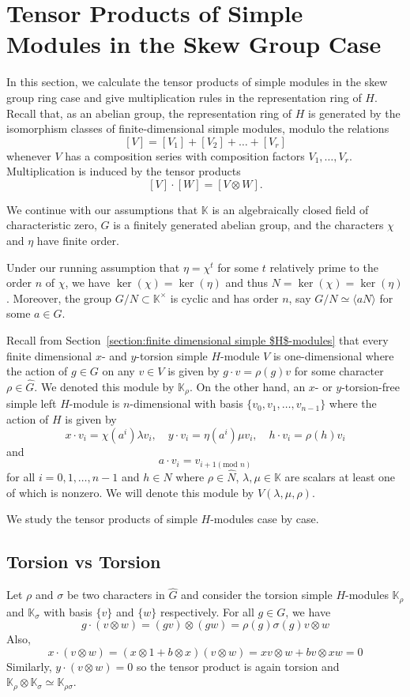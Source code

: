 \documentclass[11pt, twoside]{amsart}
\theoremstyle{definition}
\newcommand{\KK}{\mathbb{K}}
\begin{document}
\section{Tensor Products of Simple Modules in the Skew Group Case}
%
In this section, we calculate the tensor products of simple modules in the skew group ring case and give multiplication rules in the representation ring of $H$. Recall that, as an abelian group, the representation ring of $H$ is generated by the isomorphism classes of finite-dimensional simple modules, modulo the relations
%
\[[V] = [V_1] + [V_2] + \ldots + [V_r]\]
%
whenever $V$ has a composition series with composition factors $V_1, \ldots, V_r$. Multiplication is induced by the tensor products 
%
\[[V]\cdot [W] = [V \otimes W].\]
%

We continue with our assumptions that $\KK$ is an algebraically closed field of characteristic zero, $G$ is a finitely generated abelian group, and the characters $\chi$ and $\eta$ have finite order.

Under our running assumption that $\eta = \chi^t$ for some $t$ relatively prime to the order $n$ of $\chi$, we have $\ker(\chi) = \ker(\eta)$ and thus $N = \ker(\chi) = \ker(\eta)$. Moreover, the group $G/N \subset \KK^\times$ is cyclic and has order $n$, say $G/N \simeq \langle aN\rangle$ for some $a \in G$. 

Recall from Section~\ref{section:finite dimensional simple $H$-modules} that every finite dimensional $x$- and $y$-torsion simple $H$-module $V$ is one-dimensional where the action of $g \in G$ on any $v \in V$ is given by $g\cdot v = \rho(g)v$ for some character $\rho \in \widehat{G}$. We denoted this module by $\KK_\rho$. On the other hand, an $x$- or $y$-torsion-free simple left $H$-module is $n$-dimensional with basis $\{v_0, v_1, \ldots, v_{n-1}\}$ where the action of $H$ is given by
%
\[x\cdot v_i = \chi(a^i)\lambda v_i, \quad y\cdot v_i = \eta(a^i)\mu v_i, \quad h\cdot v_i = \rho(h)v_i\]
%
and 
%
\[a\cdot v_i = v_{i+1(\text{mod }n)}\]
%
for all $i = 0, 1, \ldots, n-1$ and $h \in N$ where $\rho\in \widehat{N}$, $\lambda, \mu \in \KK$ are scalars at least one of which is nonzero. We will denote this module by $V(\lambda, \mu, \rho)$. 

We study the tensor products of simple $H$-modules case by case.

\subsection{Torsion vs Torsion}
%
Let $\rho$ and $\sigma$ be two characters in $\widehat{G}$ and consider the torsion simple $H$-modules $\mathbb{K}_\rho$ and $\mathbb{K}_\sigma$ with basis $\{v\}$ and $\{w\}$ respectively. For all $g \in G$, we have
%
\[g\cdot (v\otimes w) = (gv) \otimes (gw) = \rho(g)\sigma(g)v\otimes w\]
%
Also,
%
\[x\cdot (v\otimes w) = (x\otimes 1 + b \otimes x)(v\otimes w) = xv\otimes w + bv\otimes xw = 0\]
%
Similarly, $y\cdot (v\otimes w) = 0$ so the tensor product is again torsion and $\mathbb{K}_\rho \otimes \mathbb{K}_\sigma \simeq \mathbb{K}_{\rho\sigma}$.
\end{document}
